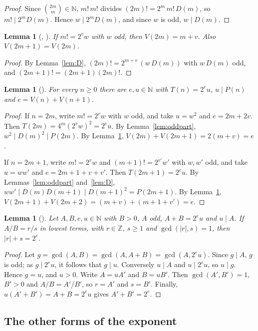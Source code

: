 \documentclass[11pt]{amsart}
\theoremstyle{plain}
\newtheorem{lemma}[theorem]{Lemma}
\theoremstyle{definition}
\newcommand{\N}{\mathbb{N}}
\newcommand{\Z}{\mathbb{Z}}
\begin{document}
\begin{proof}
Since $\binom{2m}{m}\in\N$, $m!\,m!$ divides $(2m)!=2^m\,m!\,D(m)$, so $m!\mid 2^mD(m)$. Hence $w\mid 2^mD(m)$, and since $w$ is odd, $w\mid D(m)$.
\end{proof}

\begin{lemma}[, ]\label{lem:V}
If $m!=2^vw$ with $w$ odd, then $V(2m)=m+v$. Also $V(2m+1)=V(2m)$.
\end{lemma}

\begin{proof}
By Lemma~\ref{lem:D}, $(2m)!=2^{m+v}\,(w\,D(m))$ with $w\,D(m)$ odd, and $(2m+1)!=(2m+1)(2m)!$.
\end{proof}

\begin{lemma}[]\label{lem:key}
For every $n\ge0$ there are $e,u\in\N$ with $T(n)=2^e u$, $u\mid P(n)$ and $e=V(n)+V(n+1)$.
\end{lemma}

\begin{proof}
If $n=2m$, write $m!=2^vw$ with $w$ odd, and take $u=w^2$ and $e=2m+2v$. Then $T(2m)=4^m(2^vw)^2=2^eu$. By Lemma~\ref{lem:oddpart}, $w^2\mid D(m)^2\mid P(2m)$. By Lemma~\ref{lem:V}, $V(2m)+V(2m+1)=2(m+v)=e$.

If $n=2m+1$, write $m!=2^vw$ and $(m+1)!=2^{v'}w'$ with $w,w'$ odd, and take $u=ww'$ and $e=2m+1+v+v'$. Then $T(2m+1)=2^eu$. By Lemmas~\ref{lem:oddpart} and~\ref{lem:D}, $ww'\mid D(m)D(m+1)\mid D(m+1)^2=P(2m+1)$. By Lemma~\ref{lem:V}, $V(2m+1)+V(2m+2)=(m+v)+(m+1+v')=e$.
\end{proof}

\begin{lemma}[]\label{lem:lowest}
Let $A,B,e,u\in\N$ with $B>0$, $A$ odd, $A+B=2^eu$ and $u\mid A$. If $A/B=r/s$ in lowest terms, with $r\in\Z$, $s\ge1$ and $\gcd(|r|,s)=1$, then $|r|+s=2^e$.
\end{lemma}

\begin{proof}
Let $g=\gcd(A,B)=\gcd(A,A+B)=\gcd(A,2^eu)$. Since $g\mid A$, $g$ is odd; as $g\mid 2^eu$, it follows that $g\mid u$. Conversely $u\mid A$ and $u\mid 2^eu$, so $u\mid g$. Hence $g=u$, and $u>0$. Write $A=uA'$ and $B=uB'$. Then $\gcd(A',B')=1$, $B'>0$ and $A/B=A'/B'$, so $r=A'$ and $s=B'$. Finally, $u(A'+B')=A+B=2^eu$ gives $A'+B'=2^e$.
\end{proof}

\subsection{The other forms of the exponent}
\end{document}
